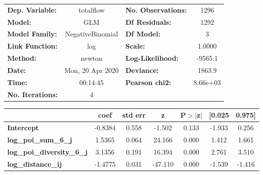 \begin{center}
\begin{tabular}{lclc}
\toprule
\textbf{Dep. Variable:}            &    totalflow     & \textbf{  No. Observations:  } &     1296    \\
\textbf{Model:}                    &       GLM        & \textbf{  Df Residuals:      } &     1292    \\
\textbf{Model Family:}             & NegativeBinomial & \textbf{  Df Model:          } &        3    \\
\textbf{Link Function:}            &       log        & \textbf{  Scale:             } &    1.0000   \\
\textbf{Method:}                   &      newton      & \textbf{  Log-Likelihood:    } &   -9565.1   \\
\textbf{Date:}                     & Mon, 20 Apr 2020 & \textbf{  Deviance:          } &    1863.9   \\
\textbf{Time:}                     &     00:14:45     & \textbf{  Pearson chi2:      } &  8.66e+03   \\
\textbf{No. Iterations:}           &        4         & \textbf{                     } &             \\
\bottomrule
\end{tabular}
\begin{tabular}{lcccccc}
                                   & \textbf{coef} & \textbf{std err} & \textbf{z} & \textbf{P$> |$z$|$} & \textbf{[0.025} & \textbf{0.975]}  \\
\midrule
\textbf{Intercept}                 &      -0.8384  &        0.558     &    -1.502  &         0.133        &       -1.933    &        0.256     \\
\textbf{log\_poi\_sum\_6\_j}       &       1.5365  &        0.064     &    24.166  &         0.000        &        1.412    &        1.661     \\
\textbf{log\_poi\_diversity\_6\_j} &       3.1356  &        0.191     &    16.394  &         0.000        &        2.761    &        3.510     \\
\textbf{log\_distance\_ij}         &      -1.4775  &        0.031     &   -47.110  &         0.000        &       -1.539    &       -1.416     \\
\bottomrule
\end{tabular}
\end{center}